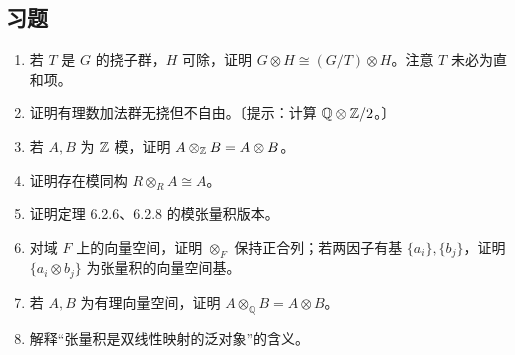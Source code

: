 \subsection*{习题}
\begin{enumerate}
\item 若 $T$ 是 $G$ 的挠子群，$H$ 可除，证明 $G\otimes H\cong(G/T)\otimes H$。注意 $T$ 未必为直和项。
\item 证明有理数加法群无挠但不自由。〔提示：计算 $\mathbb Q\otimes\mathbb{Z}/2$。〕
\item 若 $A,B$ 为 $\mathbb{Z}$ 模，证明 $A\otimes_{\mathbb{Z}}B=A\otimes B$。
\item 证明存在模同构 $R\otimes_RA\cong A$。
\item 证明定理 6.2.6、6.2.8 的模张量积版本。
\item 对域 $F$ 上的向量空间，证明 $\otimes_F$ 保持正合列；若两因子有基 $\{a_i\},\{b_j\}$，证明 $\{a_i\otimes b_j\}$ 为张量积的向量空间基。
\item 若 $A,B$ 为有理向量空间，证明 $A\otimes_{\mathbb Q}B=A\otimes B$。
\item 解释“张量积是双线性映射的泛对象”的含义。
\end{enumerate}
